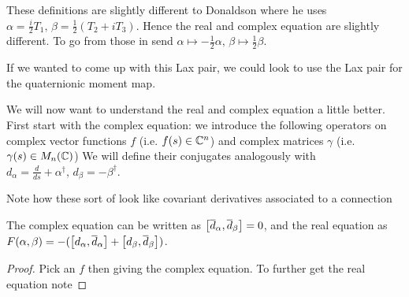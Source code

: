\documentclass{article}
\begin{document}
\begin{remark}
	These definitions are slightly different to Donaldson where he uses $\alpha = \frac{i}{2}T_1, \, \beta = \frac{1}{2}(T_2+iT_3)$. Hence the real and complex equation are slightly different. To go from those in \cite{Donaldson1984} send $\alpha \mapsto -\frac{1}{2}\alpha, \, \beta \mapsto \frac{1}{2}\beta$.
\end{remark}

\begin{remark}
	If we wanted to come up with this Lax pair, we could look to use the Lax pair for the quaternionic moment map. 
\end{remark}

We will now want to understand the real and complex equation a little better. First start with the complex equation: we introduce the following operators on complex vector functions $f$ (i.e. $f(s) \in \mbb{C}^n$) and complex matrices $\gamma$ (i.e. $\gamma(s) \in M_n(\mbb{C})$) 
We will define their conjugates analogously with $d_\alpha = \frac{d}{ds}+\alpha^\dagger, \, d_\beta =-\beta^\dagger$. 
\begin{remark}
	Note how these sort of look like covariant derivatives associated to a connection
\end{remark}
\begin{lemma}
	The complex equation can be written as $\comm[\bar{d}_\alpha]{\bar{d}_\beta} =0$, and the real equation as $F(\alpha,\beta) = -(\comm[d_\alpha]{\bar{d}_\alpha} + \comm[d_\beta]{\bar{d}_\beta})$. 
\end{lemma}
\begin{proof}
	Pick an $f$ then 
giving the complex equation. To further get the real equation note 
\end{proof}
\end{document}
